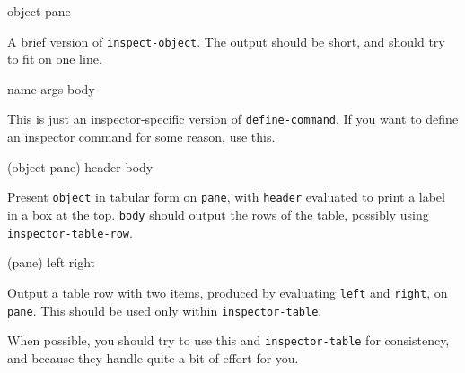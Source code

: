 {object pane}

A brief version of \texttt{inspect-object}. The output should be short,
and should try to fit on one line.

 {name args \rest body}

This is just an inspector-specific version of
\texttt{define-command}. If you want to define an inspector command for
some reason, use this.

 {(object pane) header \body body}

Present \texttt{object} in tabular form on \texttt{pane}, with \texttt{header}
evaluated to print a label in a box at the top. \texttt{body} should output
the rows of the table, possibly using \texttt{inspector-table-row}.

 {(pane) left right}

Output a table row with two items, produced by evaluating \texttt{left} and
\texttt{right}, on \texttt{pane}. This should be used only within
\texttt{inspector-table}.

When possible, you should try to use this and \texttt{inspector-table}
for consistency, and because they handle quite a bit of effort for
you.
